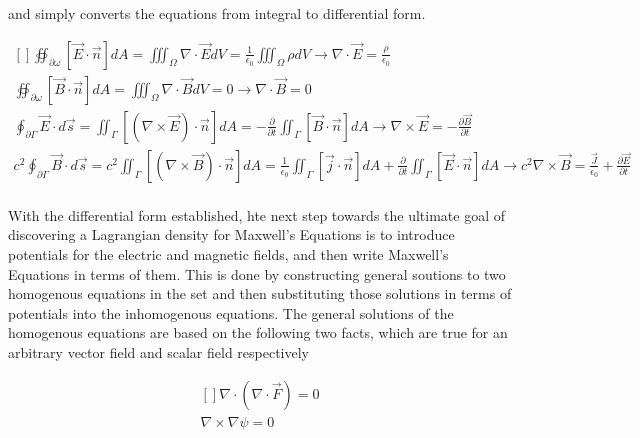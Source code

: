 \documentclass[a4]{article}
\begin{document}
    and simply converts the equations from integral to differential form.

    \begin{framed}
        \begin{equation}
            \begin{aligned}[]
                \oiint_{\partial \omega} [\vec{E} \cdot \vec{n}] dA = \iiint_{\Omega} \nabla \cdot \vec{E} dV = \frac{1}{\epsilon_0} \iiint_{\Omega} \rho dV \rightarrow \boxed{\nabla \cdot \vec{E} = \frac{\rho}{\epsilon_0}} \\
                \oiint_{\partial \omega} [\vec{B} \cdot \vec{n}] dA = \iiint_{\Omega} \nabla \cdot \vec{B} dV = 0 \rightarrow \boxed{\nabla \cdot \vec{B} = 0} \\
                \oint_{\partial \Gamma} \vec{E} \cdot d\vec{s} = \iint_{\Gamma} [(\nabla \times \vec{E}) \cdot \vec{n}]dA = - \frac{\partial}{\partial t} \iint_{\Gamma} [\vec{B} \cdot \vec{n}] dA \rightarrow \boxed{\nabla \times \vec{E} = - \frac{\partial \vec{B}}{\partial t}} \\
                c^2 \oint_{\partial \Gamma} \vec{B} \cdot d\vec{s} = c^2 \iint_{\Gamma} [(\nabla \times \vec{B}) \cdot \vec{n}]dA = \frac{1}{\epsilon_0} \iint_{\Gamma} [\vec{j} \cdot \vec{n}] dA + \frac{\partial}{\partial t} \iint_{\Gamma} [\vec{E} \cdot \vec{n}] dA \rightarrow \boxed{c^2 \nabla \times \vec{B} = \frac{\vec{J}}{\epsilon_0} + \frac{\partial \vec{E}}{\partial t}} \\
            \end{aligned}
        \end{equation}
    \end{framed}

    With the differential form established, hte next step towards the ultimate goal of discovering a Lagrangian density for Maxwell's Equations is to introduce potentials for the electric and magnetic
    fields, and then write Maxwell's Equations in terms of them. This is done by constructing general soutions to two homogenous equations in the set and then substituting those solutions in terms of 
    potentials into the inhomogenous equations. The general solutions of the homogenous equations are based on the following two facts, which are true for an arbitrary vector field and scalar field
    respectively

    \begin{framed}
        \begin{equation}
            \begin{aligned}[]
                \nabla \cdot (\nabla \cdot \vec{F}) = 0 \\ 
                \nabla \times \nabla \psi = 0
            \end{aligned}
        \end{equation}
    \end{framed}
\end{document}
